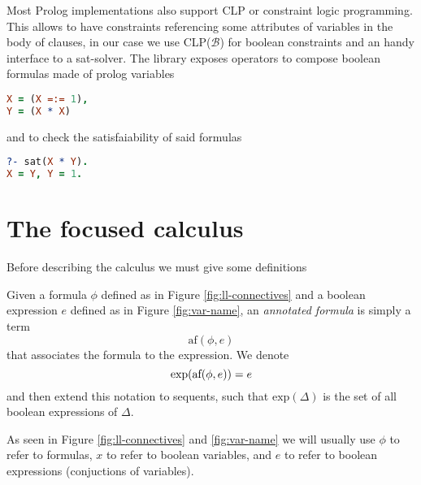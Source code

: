 \documentclass[a4paper, 12pt, tesi, english]{report}
\begin{document}
Most Prolog implementations also support CLP or constraint logic programming.
This allows to have constraints referencing some attributes of variables in the body of clauses, in our case we use CLP($\mathcal{B}$) for boolean constraints and an handy interface to a sat-solver.
The library exposes operators to compose boolean formulas made of prolog variables
\begin{lstlisting}[language=prolog, numbers=none]
X = (X =:= 1),
Y = (X * X)
\end{lstlisting}
and to check the satisfaiability of said formulas
\begin{lstlisting}[language=prolog, numbers=none]
?- sat(X * Y).
X = Y, Y = 1.
\end{lstlisting}

\chapter{The focused calculus}
Before describing the calculus we must give some definitions


\begin{define}
	Given a formula $\phi$ defined as in Figure \ref{fig:ll-connectives} and a boolean expression
	$e$ defined as in Figure \ref{fig:var-name}, an \textit{annotated formula} is simply a term 
	$$ \text{af}(\phi, e) $$
	that associates the formula to the expression.
	We denote 
	$$ \text{exp}(\text{af}(\phi, e)) = e $$
	and then extend this notation to sequents, such that $ \text{exp}(\Delta) $ is the set of all boolean expressions of $\Delta$.
\end{define}
As seen in Figure \ref{fig:ll-connectives} and \ref{fig:var-name} we will usually use $\phi$ to refer to formulas, $x$ to refer to boolean variables, and $e$ to refer to boolean expressions (conjuctions of variables).
\end{document}
